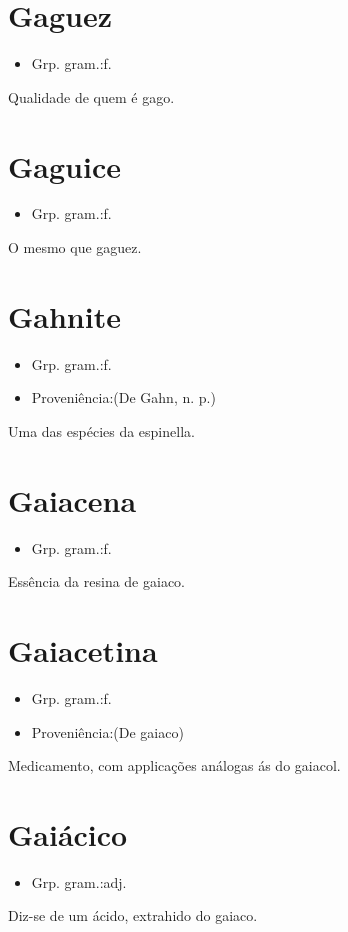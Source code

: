 \section{Gaguez}
\begin{itemize}
\item {Grp. gram.:f.}
\end{itemize}
Qualidade de quem é gago.
\section{Gaguice}
\begin{itemize}
\item {Grp. gram.:f.}
\end{itemize}
O mesmo que \textunderscore gaguez\textunderscore .
\section{Gahnite}
\begin{itemize}
\item {Grp. gram.:f.}
\end{itemize}
\begin{itemize}
\item {Proveniência:(De \textunderscore Gahn\textunderscore , n. p.)}
\end{itemize}
Uma das espécies da espinella.
\section{Gaiacena}
\begin{itemize}
\item {Grp. gram.:f.}
\end{itemize}
Essência da resina de gaiaco.
\section{Gaiacetina}
\begin{itemize}
\item {Grp. gram.:f.}
\end{itemize}
\begin{itemize}
\item {Proveniência:(De \textunderscore gaiaco\textunderscore )}
\end{itemize}
Medicamento, com applicações análogas ás do gaiacol.
\section{Gaiácico}
\begin{itemize}
\item {Grp. gram.:adj.}
\end{itemize}
Diz-se de um ácido, extrahido do gaiaco.
